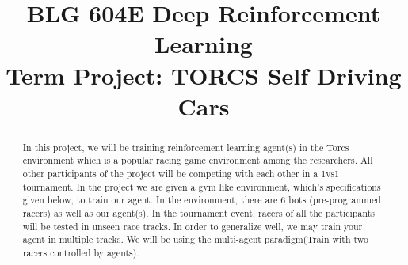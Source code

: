 \documentclass[conference]{IEEEtran}
\begin{document}
%
\title{BLG 604E Deep Reinforcement Learning \\ Term Project: TORCS Self Driving Cars }


\author{
\and
{}
\and
{}
}






\maketitle

\begin{abstract}
In this project, we will be training reinforcement learning agent(s) in the Torcs environment which is a popular racing game environment among the researchers. All other participants of the project will be competing with each other in a 1vs1 tournament. In the project we are given a gym like environment, which’s specifications given below, to train our agent. In the environment, there are 6 bots (pre-programmed racers) as well as our agent(s). In the tournament event, racers of all the participants will be tested in unseen race tracks. In order to generalize well, we may train your agent in multiple tracks. We will be using the multi-agent paradigm(Train with two racers controlled by agents).


\end{abstract}
\end{document}
